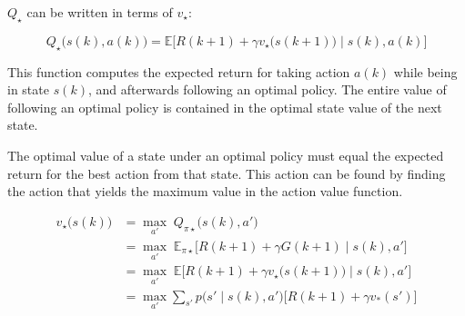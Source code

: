 $ Q_{\star} $ can be written in terms of $ v_{\star} $:


\begin{equation}
	Q_{\star}\bigg(s(k),a(k)\bigg)=\mathbb{E}\bigg[R(k+1)+\gamma v_{\star}\bigg(s(k+1)\bigg) \; \big| \; s(k),a(k) \bigg]
\end{equation}

This function computes the expected return for taking action $a(k)$ while being in state $s(k)$, and afterwards following an optimal policy. The entire value of following an optimal policy is contained in the optimal state value of the next state.

The optimal value of a state under an optimal policy must equal the expected return for the best action from that state. This action can be found by finding the action that yields the maximum value in the action value function.


\begin{equation}
	\begin{split}
		v_{\star}\bigg(s(k)\bigg)&=\underset{a'}{\max} \; Q_{\pi\star}\bigg(s(k),a'\bigg)\\
		&=\underset{a'}{\max} \; \mathbb{E}_{\pi\star}\bigg[ R(k+1)+\gamma G(k+1) \; \big| \; s(k),a'\bigg]\\
		&=\underset{a'}{\max} \; \mathbb{E}\bigg[ R(k+1)+\gamma v_{\star}\bigg(s(k+1)\bigg) \; \big| \; s(k),a'\bigg]\\
		&=\underset{a'}{\max}\sum_{s'}p\bigg(s' \; \big| \; s(k),a'\bigg)\bigg[R(k+1)+\gamma v_{*}(s')\bigg]
	\end{split}
\end{equation}


